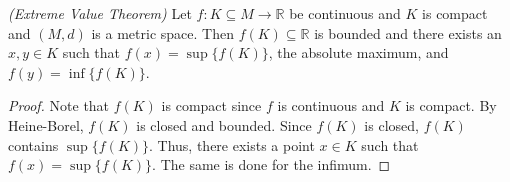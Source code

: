 \documentclass[11pt]{article}
\theoremstyle{definition}
\newcommand{\R}{\mathbb{R}}                      %
\begin{document}
\begin{shaded}
\theorem \textit{(Extreme Value Theorem)} Let $f:K\subseteq M\to \R$ be continuous and $K$ is compact and $(M,d)$ is a metric space. Then $f(K)\subseteq \R$ is bounded and there exists an $x,y\in K$ such that $f(x)=\sup\{f(K)\}$, the absolute maximum, and $f(y)=\inf\{f(K)\}$.
\end{shaded}
\begin{proof}
    Note that $f(K)$ is compact since $f$ is continuous and $K$ is compact. By Heine-Borel, $f(K)$ is closed and bounded. Since $f(K)$ is closed, $f(K)$ contains $\sup\{f(K)\}$. Thus, there exists a point $x\in K$ such that $f(x)=\sup\{f(K)\}$. The same is done for the infimum.
\end{proof}
\end{document}
